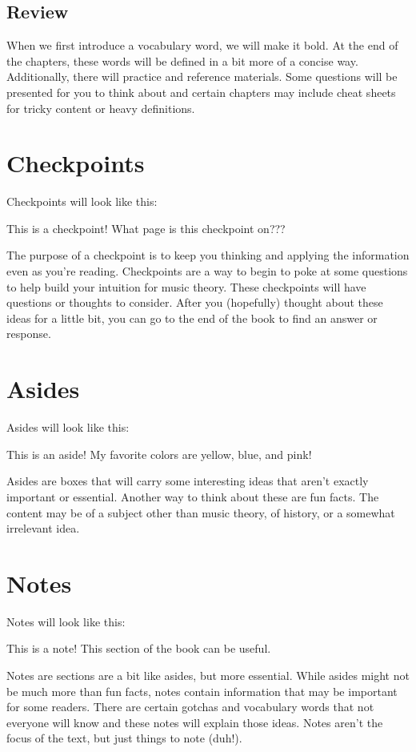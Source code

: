 \documentclass[../OpenAppliedMusicTheory.tex]{subfiles}
\begin{document}
    \subsection{Review}
    When we first introduce a vocabulary word, we will make it bold. At the end of the chapters, these words will be defined in a bit more of a concise way. Additionally, there will practice and reference materials. Some questions will be presented for you to think about and certain chapters may include cheat sheets for tricky content or heavy definitions.

    \section{Checkpoints}\label{ch0:checkpoints}
    Checkpoints will look like this:
    \begin{checkpoint}
        This is a checkpoint! What page is this checkpoint on???
    \end{checkpoint}
    The purpose of a checkpoint is to keep you thinking and applying the information even as you're reading. Checkpoints are a way to begin to poke at some questions to help build your intuition for music theory. These checkpoints will have questions or thoughts to consider. After you (hopefully) thought about these ideas for a little bit, you can go to the end of the book to find an answer or response.

    \section{Asides}\label{ch0:asides}
    Asides will look like this:
    \begin{aside}{This is an aside!}
        My favorite colors are yellow, blue, and pink!
    \end{aside}
    Asides are boxes that will carry some interesting ideas that aren't exactly important or essential. Another way to think about these are fun facts. The content may be of a subject other than music theory, of history, or a somewhat irrelevant idea.

    \section{Notes}\label{ch0:notes}
    Notes will look like this:
    \begin{note}{This is a note!}
        This section of the book can be useful.
    \end{note}
    Notes are sections are a bit like asides, but more essential. While asides might not be much more than fun facts, notes contain information that may be important for some readers. There are certain gotchas and vocabulary words that not everyone will know and these notes will explain those ideas. Notes aren't the focus of the text, but just things to note (duh!).
\end{document}
